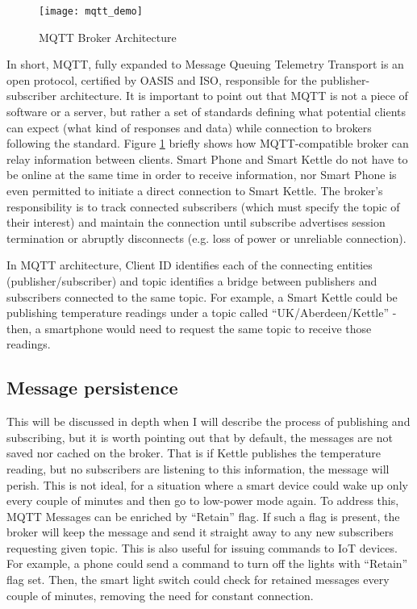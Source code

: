 \begin{figure}[ht]
    \centering
    \texttt{[image: mqtt\_demo]}
    \caption{MQTT Broker Architecture}
    \label{fig:mqtt}
\end{figure}

In short, MQTT, fully expanded to Message Queuing Telemetry Transport is an open protocol, certified by OASIS and ISO\cite{banks2019mqtt}, responsible for the publisher-subscriber architecture. It is important to point out that MQTT is not a piece of software or a server, but rather a set of standards defining what potential clients can expect (what kind of responses and data) while connection to brokers following the standard. Figure \ref{fig:mqtt} briefly shows how MQTT-compatible broker can relay information between clients. Smart Phone and Smart Kettle do not have to be online at the same time in order to receive information, nor Smart Phone is even permitted to initiate a direct connection to Smart Kettle. The broker's responsibility is to track connected subscribers (which must specify the topic of their interest) and maintain the connection until subscribe advertises session termination or abruptly disconnects (e.g. loss of power or unreliable connection).

In MQTT architecture, Client ID identifies each of the connecting entities (publisher/subscriber) and topic identifies a bridge between publishers and subscribers connected to the same topic. For example, a Smart Kettle could be publishing temperature readings under a topic called ``UK/Aberdeen/Kettle'' - then, a smartphone would need to request the same topic to receive those readings. 

\subsection{Message persistence}
This will be discussed in depth when I will describe the process of publishing and subscribing, but it is worth pointing out that by default, the messages are not saved nor cached on the broker. That is if Kettle publishes the temperature reading, but no subscribers are listening to this information, the message will perish. This is not ideal, for a situation where a smart device could wake up only every couple of minutes and then go to low-power mode again. To address this, MQTT Messages can be enriched by ``Retain'' flag. If such a flag is present, the broker will keep the message and send it straight away to any new subscribers requesting given topic. This is also useful for issuing commands to IoT devices. For example, a phone could send a command to turn off the lights with ``Retain'' flag set. Then, the smart light switch could check for retained messages every couple of minutes, removing the need for constant connection.

